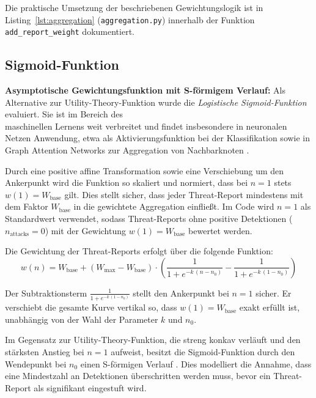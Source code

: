 Die praktische Umsetzung der beschriebenen Gewichtungslogik ist in Listing~\ref{lst:aggregation} (\texttt{aggrega\-tion.py}) innerhalb der Funktion \texttt{add\_report\_weight} dokumentiert.




\subsection{Sigmoid-Funktion}

\textbf{Asymptotische Gewichtungsfunktion mit S-förmigem Verlauf:} Als Alternative zur Utility-Theory-Funktion wurde die \textit{Logistische Sigmoid-Funktion} evaluiert. Sie ist im Bereich des\\maschinellen Lernens weit verbreitet und findet insbesondere in neuronalen Netzen Anwendung, etwa als Aktivierungsfunktion bei der Klassifikation sowie in Graph Attention Networks zur Aggregation von Nachbarknoten \cite{velickovic2018gat}.

Durch eine positive affine Transformation sowie eine Verschiebung um den Ankerpunkt wird die Funktion so skaliert und normiert, dass bei $n = 1$ stets $w(1) = W_{\text{base}}$ gilt. Dies stellt sicher, dass jeder Threat-Report mindestens mit dem Faktor $W_{\text{base}}$ in die gewichtete Aggregation einfließt. Im Code wird $n = 1$ als Standardwert verwendet, sodass Threat-Reports ohne positive Detektionen ($n_{\text{attacks}} = 0$) mit der Gewichtung $w(1) = W_{\text{base}}$ bewertet werden.

Die Gewichtung der Threat-Reports erfolgt über die folgende Funktion:
\begin{equation}
    \label{eq:sigmoid_function}
    w(n) = W_{\text{base}} + (W_{\text{max}} - W_{\text{base}}) \cdot
    \left(
        \frac{1}{1 + e^{-k\,(n - n_0)}}
        -
        \frac{1}{1 + e^{-k\,(1 - n_0)}}
    \right)
\end{equation}

Der Subtraktionsterm $\frac{1}{1 + e^{-k\,(1 - n_0)}}$ stellt den Ankerpunkt bei $n = 1$ sicher. Er verschiebt die gesamte Kurve vertikal so, dass $w(1) = W_{\text{base}}$ exakt erfüllt ist, unabhängig von der Wahl der Parameter $k$ und $n_0$.

Im Gegensatz zur Utility-Theory-Funktion, die streng konkav verläuft und den stärksten Anstieg bei $n = 1$ aufweist, besitzt die Sigmoid-Funktion durch den Wendepunkt bei $n_0$ einen S-förmigen Verlauf \cite{perezmaldonado2025sigmoid}. Dies modelliert die Annahme, dass eine Mindestzahl an Detektionen überschritten werden muss, bevor ein Threat-Report als signifikant eingestuft wird.


